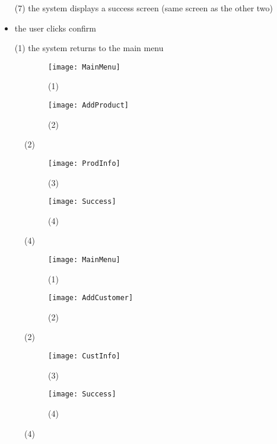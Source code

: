 \documentclass[notitlepage, 11pt]{report}
\begin{document}
\begin{enumerate}[itemindent=-1.5em]
\begin{itemize}
		\item[(7)] the system displays a success screen (same screen as the other two)
		\item the user clicks confirm
		\item[(1)] the system returns to the main menu
		\end{itemize}
\begin{figure}
	\begin{subfigure}{.5\textwidth}
	\centering
	\texttt{[image: MainMenu]}
	\caption{(1)}
	\end{subfigure}%
	\begin{subfigure}{.5\textwidth}
	\centering
	\texttt{[image: AddProduct]}
	\caption{(2)}
	\end{subfigure}
\end{figure}
\begin{figure}
	\begin{subfigure}{.5\textwidth}
	\centering
	\texttt{[image: ProdInfo]}
	\caption{(3)}
	\end{subfigure}%
	\begin{subfigure}{.5\textwidth}
	\centering
	\texttt{[image: Success]}
	\caption{(4)}
	\end{subfigure}
\end{figure}

\begin{figure}
	\begin{subfigure}{.5\textwidth}
	\centering
	\texttt{[image: MainMenu]}
	\caption{(1)}
	\end{subfigure}%
	\begin{subfigure}{.5\textwidth}
	\centering
	\texttt{[image: AddCustomer]}
	\caption{(2)}
	\end{subfigure}
\end{figure}
\begin{figure}
	\begin{subfigure}{.5\textwidth}
	\centering
	\texttt{[image: CustInfo]}
	\caption{(3)}
	\end{subfigure}%
	\begin{subfigure}{.5\textwidth}
	\centering
	\texttt{[image: Success]}
	\caption{(4)}
	\end{subfigure}
\end{figure}


\end{enumerate}
\end{document}

